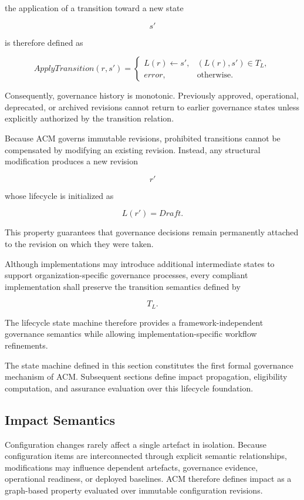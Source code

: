 \documentclass[10pt]{article}
\begin{document}
the application of a transition toward a new state

\[
s'
\]

is therefore defined as

\[
ApplyTransition(r,s')
=
\begin{cases}
L(r)\leftarrow s',
&
(L(r),s')\in T_L,\\
error,
&
\text{otherwise.}
\end{cases}
\]

Consequently, governance history is monotonic. Previously approved, operational, deprecated, or archived revisions cannot return to earlier governance states unless explicitly authorized by the transition relation.

Because ACM governs immutable revisions, prohibited transitions cannot be compensated by modifying an existing revision. Instead, any structural modification produces a new revision

\[
r'
\]

whose lifecycle is initialized as

\[
L(r')=Draft.
\]

This property guarantees that governance decisions remain permanently attached to the revision on which they were taken.

Although implementations may introduce additional intermediate states to support organization-specific governance processes, every compliant implementation shall preserve the transition semantics defined by

\[
T_L.
\]

The lifecycle state machine therefore provides a framework-independent governance semantics while allowing implementation-specific workflow refinements.

The state machine defined in this section constitutes the first formal governance mechanism of ACM. Subsequent sections define impact propagation, eligibility computation, and assurance evaluation over this lifecycle foundation.

\subsection{Impact Semantics}
\label{sec:impact}

Configuration changes rarely affect a single artefact in isolation. Because configuration items are interconnected through explicit semantic relationships, modifications may influence dependent artefacts, governance evidence, operational readiness, or deployed baselines. ACM therefore defines impact as a graph-based property evaluated over immutable configuration revisions.
\end{document}
